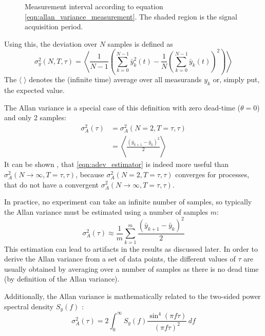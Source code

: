 \begin{figure}[hb]
    \centering
    \caption{Measurement interval according to equation \ref{eqn:allan_variance_measurement}. The shaded region is the signal acquisition period.}
    \label{fig:allan_variance_definitions}
\end{figure}

Using this, the deviation over $N$ samples is defined as \cite{adev,psd_to_adev}
\begin{equation}
    \sigma_y^2(N,T,\tau) = \left\langle \frac{1}{N-1} \left(\sum _{k=0}^{N-1}\bar y_k^2(t)-\frac{1}{N}\left(\sum _{k=0}^{N-1} \bar y_k(t)\right)^2\right)\right\rangle
\end{equation}
The $\langle \; \rangle$ denotes the (infinite time) average over all measurands $y_k$ or, simply put, the expected value.

The Allan variance is a special case of this definition with zero dead-time ($\theta=0$) and only 2 samples:
\begin{align}
    \sigma_A^2(\tau) &= \sigma_A^2(N=2,T=\tau,\tau) \label{eqn:allan_coefficients}\\
    &= \left\langle \frac{\left(\bar y_{k+1} - \bar y_k \right)^2}{2} \right\rangle
\end{align}
It can be shown \cite{psd_to_adev}, that \ref{eqn:adev_estimator} is indeed more useful than $\sigma_A^2(N\to\infty,T=\tau,\tau)$, because $\sigma_A^2(N=2,T=\tau,\tau)$ converges for processes, that do not have a convergent $\sigma_A^2(N\to\infty,T=\tau,\tau)$.

In practice, no experiment can take an infinite number of samples, so typically the Allan variance must be estimated using a number of samples $m$:
\begin{equation}
    \sigma_A^2(\tau) \approx \frac1 m \sum_{k=1}^m \frac{\left(\bar y_{k+1} - \bar y_{k} \right)^2}{2} \label{eqn:adev_estimator}
\end{equation}
This estimation can lead to artifacts in the results as discussed later. In order to derive the Allan variance from a set of data points, the different values of $\tau$ are usually obtained by averaging over a number of samples as there is no dead time (by definition of the Allan variance).

Additionally, the Allan variance is mathematically related to the two-sided power spectral density $S_y(f)$ \cite{psd_to_adev}:
\begin{equation}
    \sigma_A^2(\tau) = 2 \int_0^\infty S_y(f) \frac{\sin^4\left( \pi f \tau \right)}{(\pi f \tau)^2}\,df \label{eqn:psd_to_adev}
\end{equation}

